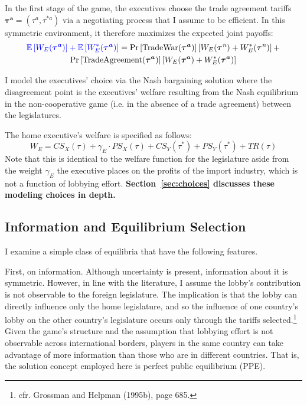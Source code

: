 \documentclass[10pt]{article}
\newcommand{\expect}{\mathbb{E}}
\newcommand{\bta}{\bm{\tau^a}}
\newcommand{\ga}{\gamma}
\begin{document}
In the first stage of the game, the executives choose the trade agreement tariffs $\bta=\left(\tau^a,\tau^{*a} \right)$ via a negotiating process that I assume to be efficient. In this symmetric environment, it therefore maximizes the expected joint payoffs:
\begin{multline}
  {\color{blue}\expect \left[W_E(\bta) \right] + \expect \left[ W_E^{*}(\bta) \right]} = \Pr\left[ \text{TradeWar}(\bta) \right] \left[W_E(\bm{\tau}^{\mathit{n}}) + W_E^*(\bm{\tau}^{\mathit{n}}) \right] + \\ \Pr\left[ \text{TradeAgreement}(\bta) \right] \left[W_E(\bta) + W_E^*(\bta) \right]
  \label{eq:jv}
\end{multline}

I model the executives' choice via the Nash bargaining solution where the disagreement point is the executives' welfare resulting from the Nash equilibrium in the non-cooperative game (i.e. in the absence of a trade agreement) between the legislatures.

The home executive's welfare is specified as follows:
\[
  W_E = \mathit{CS}_X(\tau) + \ga_E \cdot \mathit{PS}_X(\tau) + \mathit{CS}_Y(\tau^*) + \mathit{PS}_Y(\tau^*) + \mathit{TR}(\tau)
\]
Note that this is identical to the welfare function for the legislature aside from the weight $\ga_E$ the executive places on the profits of the import industry, which is not a function of lobbying effort. \textbf{Section~\ref{sec:choices} discusses these modeling choices in depth.}


\subsection{Information and Equilibrium Selection}
\label{sec:info}
I examine a simple class of equilibria that have the following features.

First, on information. Although uncertainty is present, information about it is symmetric. However, in line with the literature, I assume the lobby's contribution is not observable to the foreign legislature. The implication is that the lobby can directly influence only the home legislature, and so the influence of one country's lobby on the other country's legislature occurs only through the tariffs selected.\footnote{cfr. Grossman and Helpman (1995b), page 685.} Given the game's structure and the assumption that lobbying effort is not observable across international borders, players in the same country can take advantage of more information than those who are in different countries. That is, the solution concept employed here is perfect public equilibrium (PPE). 
\end{document}
